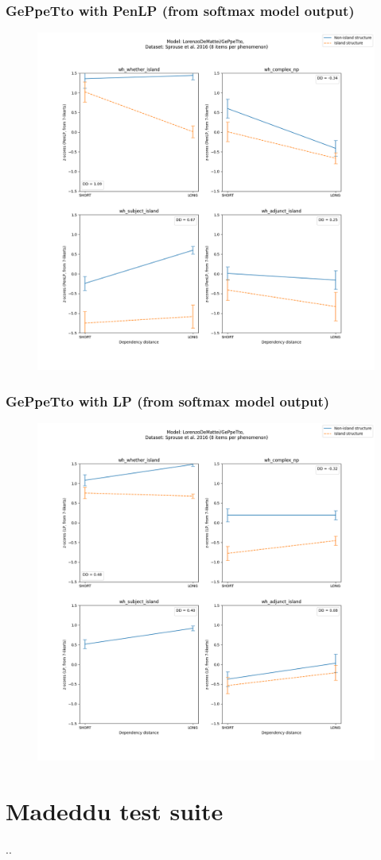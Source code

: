\subsubsection{GePpeTto with PenLP (from softmax model output)}
\begin{figure}[h]
	\centering
	\includegraphics[width=1\textwidth]{images/Chapter1/Sprouse_wh_LorenzoDeMattei_GePpeTto_PenLP-zscores-likert-2022-07-11.png} 
\end{figure}

\clearpage
\subsubsection{GePpeTto with LP (from softmax model output)}
\begin{figure}[h]
	\centering
	\includegraphics[width=1\textwidth]{images/Chapter1/Sprouse_wh_LorenzoDeMattei_GePpeTto_LP-zscores-likert-2022-07-11.png} 
\end{figure}

\clearpage
\section{Madeddu test suite}
..